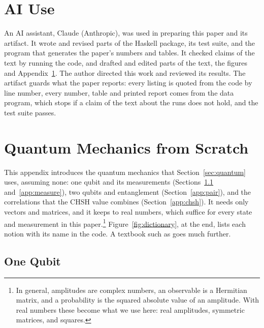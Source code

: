 \documentclass[11pt]{article}
\begin{document}
\section*{AI Use}

An AI assistant, Claude (Anthropic), was used in preparing this paper and its artifact. It wrote and revised parts of the Haskell package, its test suite, and the program that generates the paper's numbers and tables. It checked claims of the text by running the code, and drafted and edited parts of the text, the figures and Appendix~\ref{app:quantum}. The author directed this work and reviewed its results. The artifact guards what the paper reports: every listing is quoted from the code by line number, every number, table and printed report comes from the data program, which stops if a claim of the text about the runs does not hold, and the test suite passes.

\renewcommand{\bibfont}{\small}
\setlength{\bibsep}{2pt plus 1pt}



\clearpage
\appendix
\section{Quantum Mechanics from Scratch}\label{app:quantum}

This appendix introduces the quantum mechanics that Section~\ref{sec:quantum} uses, assuming none: one qubit and its measurements (Sections~\ref{app:qubit} and~\ref{app:measure}), two qubits and entanglement (Section~\ref{app:pair}), and the correlations that the CHSH value combines (Section~\ref{app:chsh}). It needs only vectors and matrices, and it keeps to real numbers, which suffice for every state and measurement in this paper.\footnote{In general, amplitudes are complex numbers, an observable is a Hermitian matrix, and a probability is the squared absolute value of an amplitude. With real numbers these become what we use here: real amplitudes, symmetric matrices, and squares.} Figure~\ref{fig:dictionary}, at the end, lists each notion with its name in the code. A textbook such as \citet{NielsenChuang2010} goes much further.

\subsection{One Qubit}\label{app:qubit}
\end{document}
